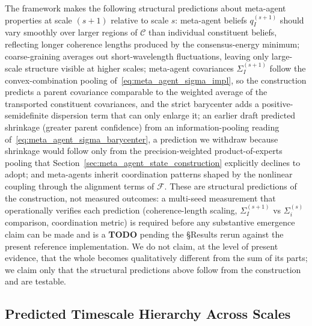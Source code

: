 \documentclass[11pt]{article}
\begin{document}
The framework makes the following structural predictions about meta-agent properties at scale $(s{+}1)$ relative to scale $s$: meta-agent beliefs $q_I^{(s+1)}$ should vary smoothly over larger regions of $\mathcal{C}$ than individual constituent beliefs, reflecting longer coherence lengths produced by the consensus-energy minimum; coarse-graining averages out short-wavelength fluctuations, leaving only large-scale structure visible at higher scales; meta-agent covariances $\Sigma_I^{(s+1)}$ follow the convex-combination pooling of~\eqref{eq:meta_agent_sigma_impl}, so the construction predicts a parent covariance comparable to the weighted average of the transported constituent covariances, and the strict barycenter adds a positive-semidefinite dispersion term that can only enlarge it; an earlier draft predicted shrinkage (greater parent confidence) from an information-pooling reading of~\eqref{eq:meta_agent_sigma_barycenter}, a prediction we withdraw because shrinkage would follow only from the precision-weighted product-of-experts pooling that Section~\ref{sec:meta_agent_state_construction} explicitly declines to adopt; and meta-agents inherit coordination patterns shaped by the nonlinear coupling through the alignment terms of $\mathcal{F}$. These are structural predictions of the construction, not measured outcomes: a multi-seed measurement that operationally verifies each prediction (coherence-length scaling, $\Sigma_I^{(s+1)}$ vs $\Sigma_i^{(s)}$ comparison, coordination metric) is required before any substantive emergence claim can be made and is a \textbf{TODO} pending the §Results rerun against the present reference implementation. We do not claim, at the level of present evidence, that the whole becomes qualitatively different from the sum of its parts; we claim only that the structural predictions above follow from the construction and are testable.

\subsection{Predicted Timescale Hierarchy Across Scales}
\label{sec:emergent_timescale}
\end{document}
